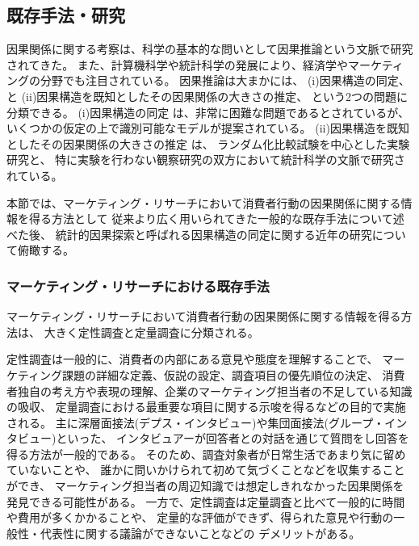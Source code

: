 
\subsection{既存手法・研究}

因果関係に関する考察は、科学の基本的な問いとして因果推論という文脈で研究されてきた。
また、計算機科学や統計科学の発展により、経済学やマーケティングの分野でも注目されている\cite{Varian2016-se}。
因果推論は大まかには、
(i)因果構造の同定、と
(ii)因果構造を既知としたその因果関係の大きさの推定、
という2つの問題に分類できる。
(i)因果構造の同定 は、非常に困難な問題であるとされているが、
いくつかの仮定の上で識別可能なモデルが提案されている。
(ii)因果構造を既知としたその因果関係の大きさの推定 は、
ランダム化比較試験を中心とした実験研究と、
特に実験を行わない観察研究の双方において統計科学の文脈で研究されている。

本節では、マーケティング・リサーチにおいて消費者行動の因果関係に関する情報を得る方法として
従来より広く用いられてきた一般的な既存手法について述べた後、
統計的因果探索と呼ばれる因果構造の同定に関する近年の研究について俯瞰する。

\subsubsection{マーケティング・リサーチにおける既存手法}

マーケティング・リサーチにおいて消費者行動の因果関係に関する情報を得る方法は、
大きく定性調査と定量調査に分類される。

定性調査は一般的に、消費者の内部にある意見や態度を理解することで、
マーケティング課題の詳細な定義、仮説の設定、調査項目の優先順位の決定、
消費者独自の考え方や表現の理解、企業のマーケティング担当者の不足している知識の吸収、
定量調査における最重要な項目に関する示唆を得るなどの目的で実施される\cite{2018-ci}。
主に深層面接法(デプス・インタビュー)や集団面接法(グループ・インタビュー)といった、
インタビュアーが回答者との対話を通じて質問をし回答を得る方法が一般的である。
そのため、調査対象者が日常生活であまり気に留めていないことや、
誰かに問いかけられて初めて気づくことなどを収集することができ\cite{2018-ci}、
マーケティング担当者の周辺知識では想定しきれなかった因果関係を発見できる可能性がある。
一方で、定性調査は定量調査と比べて一般的に時間や費用が多くかかることや、
定量的な評価ができず、得られた意見や行動の一般性・代表性に関する議論ができないことなどの
デメリットがある。

